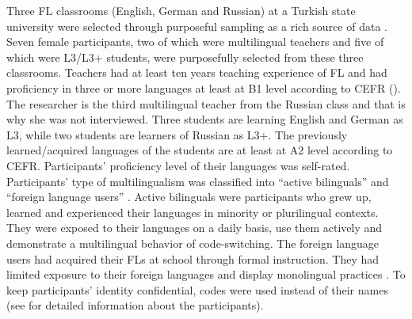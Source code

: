 \documentclass[output=paper]{../langscibook}
\begin{document}
Three FL classrooms (English, German and Russian) at a Turkish state university were selected through purposeful sampling as a rich source of data \citep{Patton2002}. Seven female participants, two of which were multilingual teachers and five of which were L3/L3+ students, were purposefully selected from these three classrooms. Teachers had at least ten years teaching experience of FL and had proficiency in three or more languages at least at B1 level according to CEFR (\citealt{CouncilOfEurope2001}). The researcher is the third multilingual teacher from the Russian class and that is why she was not interviewed. Three students are learning English and German as L3, while two students are learners of Russian as L3+. The previously learned/acquired languages of the students are at least at A2 level according to CEFR.  Participants’ proficiency level of their languages was self-rated. Participants’ type of multilingualism was classified into “active bilinguals” and “foreign language users” \citep[82]{Cenoz2013b}. Active bilinguals were participants who grew up, learned and experienced their languages in minority or plurilingual contexts. They were exposed to their languages on a daily basis, use them actively and demonstrate a multilingual behavior of code-switching. The foreign language users had acquired their FLs at school through formal instruction. They had limited exposure to their foreign languages and display monolingual practices \citep[82]{Cenoz2013b}. To keep participants’ identity confidential, codes were used instead of their names (see  for detailed information about the participants).
\end{document}
